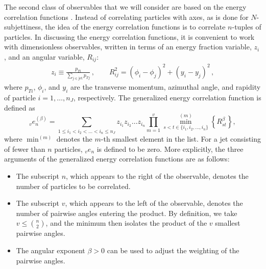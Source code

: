 \documentclass[11pt]{cernrep}
\begin{document}
The second class of observables that we will consider are based on the energy correlation functions \cite{Larkoski:2013eya,Moult:2016cvt}.
%
Instead of correlating particles with axes, as is done for $N$-subjettiness, the idea of the energy correlation functions is to correlate $n$-tuples of particles.
%
In discussing the energy correlation functions, it is convenient to work with dimensionless observables, written in terms of an energy fraction variable, $z_i$, and an angular variable, $R_{ij}$:
\begin{align}\label{jetsub_2prong_eq:ptratio}  
z_i\equiv\frac{p_{Ti}}{\sum_{j \in \text{jet}} p_{Tj}}\,, \qquad   R_{ij}^2 = (\phi_i-\phi_j)^2+(y_i-y_j)^2\,,
\end{align}
where $p_{Ti}$, $\phi_i$, and $y_i$ are the transverse momentum,
azimuthal angle, and rapidity of particle $i=1,\dots,n_J$, respectively. 
%
%
The generalized energy correlation function is defined as
\begin{equation}\label{jetsub_2prong_eq:ecf_gen}
_v e_n^{(\beta)} = \sum_{1 \leq i_1 < i_2 < \dots < i_n \leq n_J} z_{i_1} z_{i_2} \dots z_{i_n} \prod_{m = 1}^{v} \min^{(m)}_{s < t \in \{i_1, i_2 , \dots, i_n \}} \left\{ R_{st}^{\beta} \right\},
\end{equation}
where $\min^{(m)}$ denotes the $m$-th smallest element in the list.  For a jet consisting of fewer than $n$ particles, $_v e_n$ is defined to be zero.  More explicitly, the three arguments of the generalized energy correlation functions are as follows:
\begin{itemize}
\item The subscript $n$, which appears to the right of the observable, denotes the number of particles to be correlated.   
\item The subscript $v$, which appears to the left of the observable, denotes the number of pairwise angles entering the product.  By definition, we take $v \leq \binom{n}{2}$, and the minimum then isolates the product of the $v$ smallest pairwise angles.
\item The angular exponent $\beta>0$ can be used to adjust the weighting of the pairwise angles.
\end{itemize}
\end{document}
